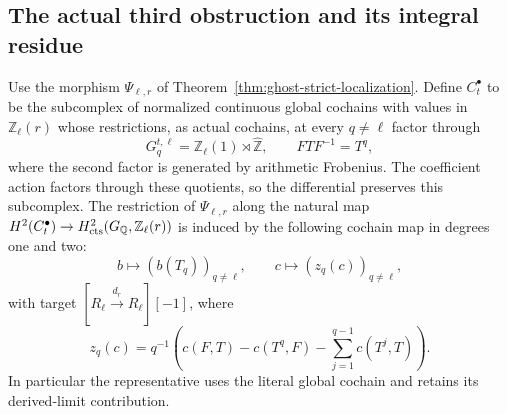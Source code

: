\subsection{The actual third obstruction and its integral residue}
\label{sec:ghost-third-obstruction}

\begin{proposition}
\label{prop:ghost-tame-cochain}
Use the morphism \(\Psi_{\ell,r}\) of
Theorem~\ref{thm:ghost-strict-localization}. Define
\(C_t^\bullet\) to be the subcomplex of normalized
continuous global cochains with values in
\(\mathbb Z_\ell(r)\) whose restrictions, as actual
cochains, at every \(q\ne\ell\) factor through
\[
 G_q^{t,\ell}=\mathbb Z_\ell(1)\rtimes\widehat{\mathbb Z},
       \qquad FT F^{-1}=T^q,
\]
where the second factor is generated by arithmetic Frobenius.
The coefficient action factors through these quotients,
so the differential preserves this subcomplex. The
restriction of \(\Psi_{\ell,r}\) along the natural map
\(H^2(C_t^\bullet)\to H^2_{\rm cts}
(G_{\mathbb Q},\mathbb Z_\ell(r))\) is induced by the
following cochain map in degrees one and two:
\[
 b\longmapsto (b(T_q))_{q\ne\ell},\qquad
 c\longmapsto (z_q(c))_{q\ne\ell},
\]
with target \([R_\ell\xrightarrow{d_r}R_\ell][-1]\),
where
\[
 z_q(c)=q^{-1}\left(c(F,T)-c(T^q,F)
                         -\sum_{j=1}^{q-1}c(T^j,T)\right).
\]
In particular the representative uses the literal global
cochain and retains its derived-limit contribution.
\end{proposition}
